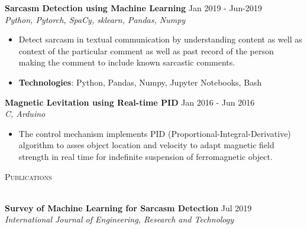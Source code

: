 \documentclass[a4paper]{article}
\newcommand{\lineunder} {
    \vspace*{-8pt} \\
    \hspace*{-18pt} \hrulefill \\
}
\newcommand{\header} [1] {
    {\hspace*{-18pt}\vspace*{6pt} \textsc{#1}}
    \vspace*{-6pt} \lineunder
}
\begin{document}
{\textbf{Sarcasm Detection using Machine Learning}} \hfill Jan 2019 - Jun-2019\\
\textit{Python, Pytorch, SpaCy, sklearn, Pandas, Numpy} \\
\begin{itemize}
   \item Detect sarcasm in textual communication by understanding content as well as context of the particular comment as well as past record of the person making the comment to include known sarcastic comments.\\
  \item \textbf{Technologies}: Python, Pandas, Numpy, Jupyter Notebooks, Bash
\end{itemize}
\vspace*{2mm}

{\textbf{Magnetic Levitation using Real-time PID}} \hfill Jan 2016 - Jun 2016\\
\textit{C, Arduino} \\
\begin{itemize}
  \item The control mechanism implements PID (Proportional-Integral-Derivative) algorithm to asses object location and velocity to adapt magnetic field strength in real time for indefinite suspension of ferromagnetic object.\\
\end{itemize}
\vspace*{2mm}

\header{Publications}
\vspace{1mm}

{\textbf{Survey of Machine Learning for Sarcasm Detection}} \hfill Jul 2019\\
\textit{International Journal of Engineering, Research and Technology} \\
\vspace*{2mm}
\end{document}
